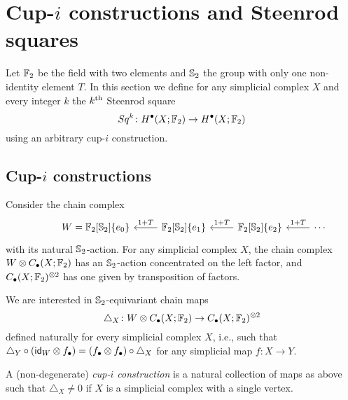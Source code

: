 
\section{Cup-\texorpdfstring{$i$}{i} constructions and Steenrod squares} \label{s:squares}

Let ${\mathbb{F}_2}$ be the field with two elements and $\mathbb{S}_2$ the group with only one non-identity element $T$.
In this section we define for any simplicial complex $X$ and every integer $k$ the $k^{\mathrm{th}}$ Steenrod square
\begin{equation*}
Sq^k \colon H^\bullet(X; {\mathbb{F}_2}) \to H^{\bullet}(X; {\mathbb{F}_2})
\end{equation*}
using an arbitrary cup-$i$ construction.

\subsection{Cup-$i$ constructions}

Consider the chain complex
\begin{equation*}
\begin{tikzcd}[column sep=normal]
& W =  \Ftwo[\Sym_2]\{e_0\} & \arrow[l, "1+T"'] \Ftwo[\Sym_2]\{e_1\} & \arrow[l, "1+T"']
\Ftwo[\Sym_2]\{e_2\} & \arrow[l, "1+T"'] \cdots
\end{tikzcd}
\end{equation*}
with its natural $\mathbb{S}_2$-action.
For any simplicial complex $X$, the chain complex $W \otimes C_\bullet(X; {\mathbb{F}_2})$ has an $\mathbb{S}_2$-action concentrated on the left factor, and $C_\bullet(X; {\mathbb{F}_2})^{\otimes 2}$ has one given by transposition of factors.

We are interested in $\mathbb{S}_2$-equivariant chain maps
\begin{equation} \label{e:steenrod diagonal}
\triangle_X \colon W \otimes C_\bullet(X; {\mathbb{F}_2}) \to C_\bullet(X; {\mathbb{F}_2})^{\otimes 2}
\end{equation}
defined naturally for every simplicial complex $X$, i.e., such that $\triangle_Y \circ (\mathsf{id}_W \otimes f_\bullet) = (f_\bullet \otimes f_\bullet) \circ \triangle_X$ for any simplicial map $f \colon X \to Y$.

\begin{definition}
	A (non-degenerate) \textit{cup-$i$ construction} is a natural collection of maps as above such that $\triangle_X \neq 0$ if $X$ is a simplicial complex with a single vertex.
\end{definition}

